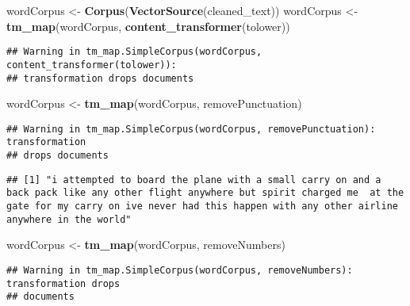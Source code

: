 \documentclass[
]{article}
\newenvironment{Shaded}{\begin{snugshade}}{\end{snugshade}}
\newcommand{\DecValTok}[1]{\textcolor[rgb]{0.00,0.00,0.81}{#1}}
\newcommand{\FunctionTok}[1]{\textcolor[rgb]{0.13,0.29,0.53}{\textbf{#1}}}
\newcommand{\NormalTok}[1]{#1}
\newcommand{\OtherTok}[1]{\textcolor[rgb]{0.56,0.35,0.01}{#1}}
\newcommand{\SpecialCharTok}[1]{\textcolor[rgb]{0.81,0.36,0.00}{\textbf{#1}}}
\begin{document}
\begin{Shaded}
\begin{Highlighting}[]
\NormalTok{wordCorpus }\OtherTok{\textless{}{-}} \FunctionTok{Corpus}\NormalTok{(}\FunctionTok{VectorSource}\NormalTok{(cleaned\_text))}
\NormalTok{wordCorpus }\OtherTok{\textless{}{-}} \FunctionTok{tm\_map}\NormalTok{(wordCorpus, }\FunctionTok{content\_transformer}\NormalTok{(tolower))}
\end{Highlighting}
\end{Shaded}

\begin{verbatim}
## Warning in tm_map.SimpleCorpus(wordCorpus, content_transformer(tolower)):
## transformation drops documents
\end{verbatim}

\begin{Shaded}
\begin{Highlighting}[]
\NormalTok{wordCorpus }\OtherTok{\textless{}{-}} \FunctionTok{tm\_map}\NormalTok{(wordCorpus, removePunctuation)}
\end{Highlighting}
\end{Shaded}

\begin{verbatim}
## Warning in tm_map.SimpleCorpus(wordCorpus, removePunctuation): transformation
## drops documents
\end{verbatim}

\begin{Shaded}
\end{Shaded}

\begin{verbatim}
## [1] "i attempted to board the plane with a small carry on and a back pack like any other flight anywhere but spirit charged me  at the gate for my carry on ive never had this happen with any other airline anywhere in the world"
\end{verbatim}

\begin{Shaded}
\begin{Highlighting}[]
\NormalTok{wordCorpus }\OtherTok{\textless{}{-}} \FunctionTok{tm\_map}\NormalTok{(wordCorpus, removeNumbers)}
\end{Highlighting}
\end{Shaded}

\begin{verbatim}
## Warning in tm_map.SimpleCorpus(wordCorpus, removeNumbers): transformation drops
## documents
\end{verbatim}
\end{document}
